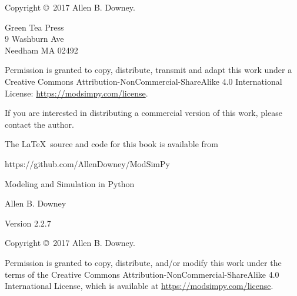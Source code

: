 \documentclass[12pt]{book}
\newcommand{\thetitle}{Modeling and Simulation in Python}
\newcommand{\theauthors}{Allen B. Downey}
\newcommand{\theversion}{2.2.7}
\theoremstyle{exercise}
\begin{document}
\begin{latexonly}
\begin{flushright}
\vfill

\end{flushright}



\pagebreak
\thispagestyle{empty}

Copyright \copyright ~2017 \theauthors.



\vspace{0.2in}

\begin{flushleft}
Green Tea Press       \\
9 Washburn Ave \\
Needham MA 02492
\end{flushleft}

Permission is granted to copy, distribute, transmit and adapt this work under a Creative Commons Attribution-NonCommercial-ShareAlike 4.0 International License: \url{https://modsimpy.com/license}.

If you are interested in distributing a commercial version of this
work, please contact the author.

The \LaTeX\ source and code for this book is available from

\begin{code}
https://github.com/AllenDowney/ModSimPy
\end{code}


\cleardoublepage
\setcounter{tocdepth}{1}
\tableofcontents

\end{latexonly}



\begin{htmlonly}

\vspace{1em}

{\Large \thetitle}

{\large \theauthors}

Version \theversion

\vspace{1em}

Copyright \copyright ~2017 \theauthors.

Permission is granted to copy, distribute, and/or modify this work
under the terms of the Creative Commons
Attribution-NonCommercial-ShareAlike 4.0 International License, which is
available at \url{https://modsimpy.com/license}.

\vspace{1em}

\setcounter{chapter}{-1}

\end{htmlonly}
\end{document}

